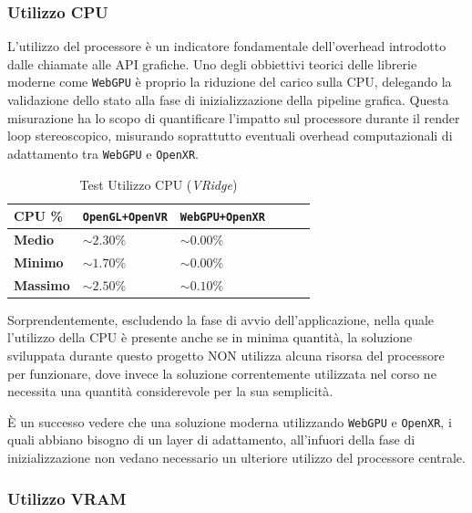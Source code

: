 \documentclass[a4paper, 11pt, twoside]{report}
\begin{document}
\pagebreak

\subsubsection{Utilizzo CPU}

L'utilizzo del processore è un indicatore fondamentale dell'overhead introdotto dalle chiamate alle API grafiche.
Uno degli obbiettivi teorici delle librerie moderne come \texttt{WebGPU} è proprio la riduzione del carico sulla CPU,
delegando la validazione dello stato alla fase di inizializzazione della pipeline grafica.
Questa misurazione ha lo scopo di quantificare l'impatto sul processore durante il render loop stereoscopico, misurando
soprattutto eventuali overhead computazionali di adattamento tra \texttt{WebGPU} e \texttt{\gls{OpenXR}}.

\begin{table}[ht]
\centering
\caption{Test Utilizzo CPU (\textit{VRidge})}
\begin{tabular}{lp{5cm}lp{5cm}lp{5cm}}
\toprule
\textbf{CPU \%} &
\textcolor{blue!40}{\textbf{\texttt{OpenGL+OpenVR}}} &
\textcolor{violet!75}{\textbf{\texttt{WebGPU+OpenXR}}} \\
\midrule
\textbf{Medio}   & $\sim2.30$\% & $\sim0.00$\%          \\
\textbf{Minimo}  & $\sim1.70$\% & $\sim0.00$\%          \\
\textbf{Massimo} & $\sim2.50$\% & $\sim0.10$\%          \\
\bottomrule
\end{tabular}
\end{table}

Sorprendentemente, escludendo la fase di avvio dell'applicazione, nella quale l'utilizzo della CPU è presente anche se
in minima quantità, la soluzione sviluppata durante questo progetto NON utilizza alcuna risorsa del processore per
funzionare, dove invece la soluzione correntemente utilizzata nel corso ne necessita una quantità considerevole per
la sua semplicità.

È un successo vedere che una soluzione moderna utilizzando \texttt{WebGPU} e \texttt{\gls{OpenXR}}, i quali abbiano
bisogno di un layer di adattamento, all'infuori della fase di inizializzazione non vedano necessario un ulteriore
utilizzo del processore centrale.

\subsubsection{Utilizzo VRAM}
\end{document}
